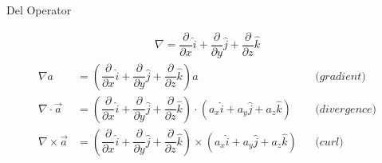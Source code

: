 \documentclass{article}
\begin{document}
\large
\ttfamily
\sloppy
\boldmath
\begin{center}
Del Operator
\end{center}
\def\del{\dfrac{\partial}{\partial x} \hat{i} + \dfrac{\partial}{\partial y} \hat{j} + \dfrac{\partial}{\partial z} \hat{k}}
\def\veca{a_x\hat{i} + a_y\hat{j} + a_z\hat{k}}
\begin{align*}
\nabla = \del
\end{align*}
\vspace*{\fill}
\begin{align*}
\nabla a &= \left(\del\right)a &&\textit{(gradient)}\\[4mm]
\nabla \cdot \vec{a} &= \left(\del\right) \cdot \left( \veca \right) &&\textit{(divergence)} \\[4mm]
\nabla \times \vec{a} &= \left(\del\right)\times\left(\veca\right) &&\textit{(curl)}\\
\end{align*}
\vspace*{\fill}
\end{document}
